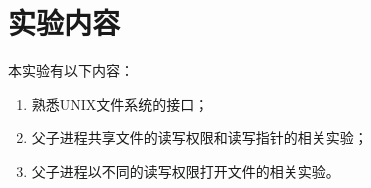 \section{实验内容}
本实验有以下内容：
\begin{enumerate}
    \item 熟悉UNIX文件系统的接口；
    \item 父子进程共享文件的读写权限和读写指针的相关实验；
    \item 父子进程以不同的读写权限打开文件的相关实验。
\end{enumerate}
